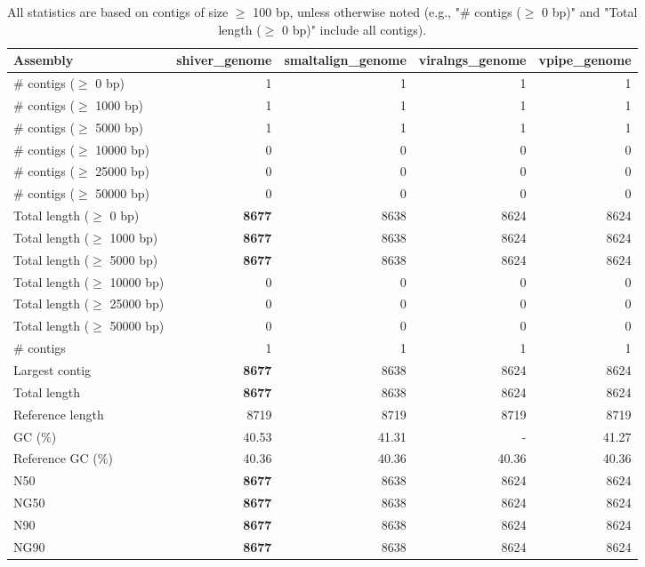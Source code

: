 \documentclass[12pt,a4paper]{article}
\begin{document}
\begin{table}[ht]
\begin{center}
\caption{All statistics are based on contigs of size $\geq$ 100 bp, unless otherwise noted (e.g., "\# contigs ($\geq$ 0 bp)" and "Total length ($\geq$ 0 bp)" include all contigs).}
\begin{tabular}{|l*{4}{|r}|}
\hline
Assembly & shiver\_genome & smaltalign\_genome & viralngs\_genome & vpipe\_genome \\ \hline
\# contigs ($\geq$ 0 bp) & 1 & 1 & 1 & 1 \\ \hline
\# contigs ($\geq$ 1000 bp) & 1 & 1 & 1 & 1 \\ \hline
\# contigs ($\geq$ 5000 bp) & 1 & 1 & 1 & 1 \\ \hline
\# contigs ($\geq$ 10000 bp) & 0 & 0 & 0 & 0 \\ \hline
\# contigs ($\geq$ 25000 bp) & 0 & 0 & 0 & 0 \\ \hline
\# contigs ($\geq$ 50000 bp) & 0 & 0 & 0 & 0 \\ \hline
Total length ($\geq$ 0 bp) & {\bf 8677} & 8638 & 8624 & 8624 \\ \hline
Total length ($\geq$ 1000 bp) & {\bf 8677} & 8638 & 8624 & 8624 \\ \hline
Total length ($\geq$ 5000 bp) & {\bf 8677} & 8638 & 8624 & 8624 \\ \hline
Total length ($\geq$ 10000 bp) & 0 & 0 & 0 & 0 \\ \hline
Total length ($\geq$ 25000 bp) & 0 & 0 & 0 & 0 \\ \hline
Total length ($\geq$ 50000 bp) & 0 & 0 & 0 & 0 \\ \hline
\# contigs & 1 & 1 & 1 & 1 \\ \hline
Largest contig & {\bf 8677} & 8638 & 8624 & 8624 \\ \hline
Total length & {\bf 8677} & 8638 & 8624 & 8624 \\ \hline
Reference length & 8719 & 8719 & 8719 & 8719 \\ \hline
GC (\%) & 40.53 & 41.31 & - & 41.27 \\ \hline
Reference GC (\%) & 40.36 & 40.36 & 40.36 & 40.36 \\ \hline
N50 & {\bf 8677} & 8638 & 8624 & 8624 \\ \hline
NG50 & {\bf 8677} & 8638 & 8624 & 8624 \\ \hline
N90 & {\bf 8677} & 8638 & 8624 & 8624 \\ \hline
NG90 & {\bf 8677} & 8638 & 8624 & 8624 \\ \hline

\end{tabular}
\end{center}
\end{table}
\end{document}
